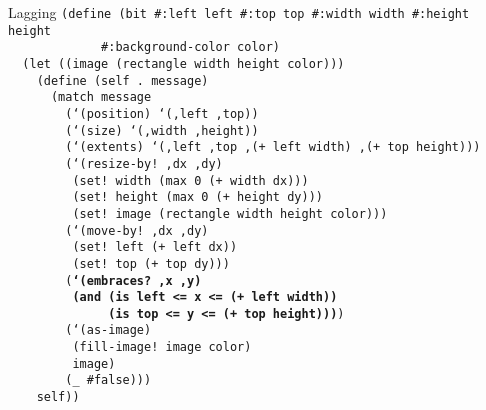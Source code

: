 \begin{frame}{Lagging}
  \tiny
  \texttt{(define (bit \#:left left \#:top top \#:width width \#:height height\\
    \ \ \ \ \ \ \ \ \ \ \ \ \ \#:background-color color)\\
    \ \ (let ((image (rectangle width height color)))\\
    \ \ \ \ (define (self .\ message)\\
    \ \ \ \ \ \ (match message\\
    \ \ \ \ \ \ \ \ (`(position) `(,left ,top))\\
    \ \ \ \ \ \ \ \ (`(size) `(,width ,height))\\
    \ \ \ \ \ \ \ \ (`(extents) `(,left ,top ,(+ left width) ,(+ top height)))\\
    \ \ \ \ \ \ \ \ (`(resize-by!\ ,dx ,dy)\\
    \ \ \ \ \ \ \ \ \ (set!\ width (max 0 (+ width dx)))\\
    \ \ \ \ \ \ \ \ \ (set!\ height (max 0 (+ height dy)))\\
    \ \ \ \ \ \ \ \ \ (set!\ image (rectangle width height color)))\\
    \ \ \ \ \ \ \ \ (`(move-by!\ ,dx ,dy)\\
    \ \ \ \ \ \ \ \ \ (set!\ left (+ left dx))\\
    \ \ \ \ \ \ \ \ \ (set!\ top (+ top dy)))\\
    \ \ \ \ \ \ \ \ (\textbf{`(embraces?\ ,x ,y)\\
    \ \ \ \ \ \ \ \ \ (and (is left <= x <= (+ left width))\\
    \ \ \ \ \ \ \ \ \ \ \ \ \ \ (is top <= y <= (+ top height)))})\\
    \ \ \ \ \ \ \ \ (`(as-image)\\
    \ \ \ \ \ \ \ \ \ (fill-image!\ image color)\\
    \ \ \ \ \ \ \ \ \ image)\\
    \ \ \ \ \ \ \ \ (\_ \#false)))\\
    \ \ \ \ self))
  }
\end{frame}

